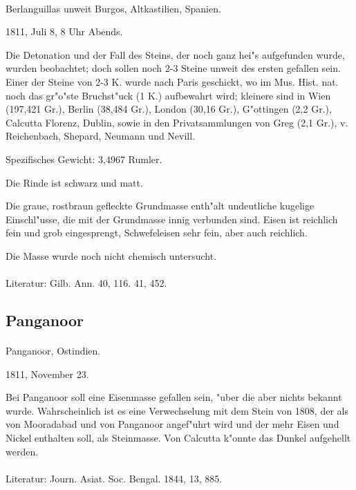 \documentclass[a4paper, 11pt, oneside]{article}
\begin{document}
\paragraph{}
Berlanguillas unweit Burgos, Altkastilien, Spanien.

1811, Juli 8, 8 Uhr Abends.

Die Detonation und der Fall des Steins, der noch ganz hei"s aufgefunden wurde, wurden beobachtet; doch sollen noch 2-3 Steine unweit des ersten gefallen sein. Einer der Steine von 2-3 K. wurde nach Paris geschickt, wo im Mus. Hist. nat. noch das gr"o"ste Bruchst"uck (1 K.) aufbewahrt wird; kleinere sind in Wien (197,421 Gr.), Berlin (38,484 Gr.), London (30,16 Gr.), G"ottingen (2,2 Gr.), Calcutta Florenz, Dublin, sowie in den Privatsammlungen von Greg (2,1 Gr.), v. Reichenbach, Shepard, Neumann und Nevill.

Spezifisches Gewicht: 3,4967 Rumler.

Die Rinde ist schwarz und matt.

Die graue, rostbraun gefleckte Grundmasse enth"alt undeutliche kugelige Einschl"usse, die mit der Grundmasse innig verbunden sind. Eisen ist reichlich fein und grob eingesprengt, Schwefeleisen sehr fein, aber auch reichlich.

Die Masse wurde noch nicht chemisch untersucht.
\footnotesize
\paragraph{}
Literatur: Gilb. Ann. 40, 116. 41, 452.
\subsection{Panganoor}
\normalsize
\paragraph{}
Panganoor, Ostindien.

1811, November 23.

Bei Panganoor soll eine Eisenmasse gefallen sein, "uber die aber nichts bekannt wurde. Wahrscheinlich ist es eine Verwechselung mit dem Stein von 1808, der als von Mooradabad und von Panganoor angef"uhrt wird und der mehr Eisen und Nickel enthalten soll, als Steinmasse. Von Calcutta k"onnte das Dunkel aufgehellt werden.
\footnotesize
\paragraph{}
Literatur: Journ. Asiat. Soc. Bengal. 1844, 13, 885.
\end{document}
